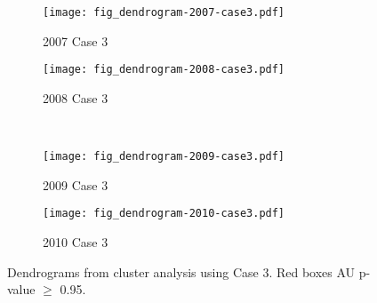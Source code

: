 \begin{figure}[!ht] \centering
	\captionsetup[subfigure]{width=2.0in} %
	\begin{subfigure}[t]{0.49\textwidth}
		\texttt{[image: fig\_dendrogram-2007-case3.pdf]}
		\caption[Case 3 cluster dendrograms.]{2007 Case 3}
		\label{fig: result-fig4.10a}
	\end{subfigure}
	\begin{subfigure}[t]{0.49\textwidth}
		\texttt{[image: fig\_dendrogram-2008-case3.pdf]}
		\caption[Case 3 cluster dendrograms.]{2008 Case 3}
		\label{fig: result-fig4.10b}
	\end{subfigure}\\
	\vspace{15pt}
	\begin{subfigure}[t]{0.49\textwidth}
		\texttt{[image: fig\_dendrogram-2009-case3.pdf]}
		\caption[Case 3 cluster dendrograms.]{2009 Case 3}
		\label{fig: result-fig4.10c}
	\end{subfigure}
	\begin{subfigure}[t]{0.49\textwidth}
		\texttt{[image: fig\_dendrogram-2010-case3.pdf]}
		\caption[Case 3 cluster dendrograms.]{2010 Case 3}
		\label{fig: result-fig4.10d}
	\end{subfigure}
	\vspace{5pt}
	\caption[Dendrograms from cluster analysis using Case 3.]{Dendrograms from cluster analysis using Case 3. Red boxes AU p-value $\geq$ 0.95.}
	\label{fig: result-fig4.10}
\end{figure}

